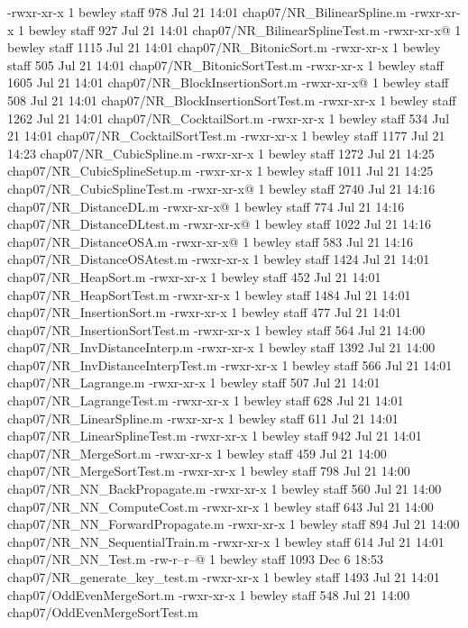 -rwxr-xr-x  1 bewley  staff    978 Jul 21 14:01 chap07/NR_BilinearSpline.m
-rwxr-xr-x  1 bewley  staff    927 Jul 21 14:01 chap07/NR_BilinearSplineTest.m
-rwxr-xr-x@ 1 bewley  staff   1115 Jul 21 14:01 chap07/NR_BitonicSort.m
-rwxr-xr-x  1 bewley  staff    505 Jul 21 14:01 chap07/NR_BitonicSortTest.m
-rwxr-xr-x  1 bewley  staff   1605 Jul 21 14:01 chap07/NR_BlockInsertionSort.m
-rwxr-xr-x@ 1 bewley  staff    508 Jul 21 14:01 chap07/NR_BlockInsertionSortTest.m
-rwxr-xr-x  1 bewley  staff   1262 Jul 21 14:01 chap07/NR_CocktailSort.m
-rwxr-xr-x  1 bewley  staff    534 Jul 21 14:01 chap07/NR_CocktailSortTest.m
-rwxr-xr-x  1 bewley  staff   1177 Jul 21 14:23 chap07/NR_CubicSpline.m
-rwxr-xr-x  1 bewley  staff   1272 Jul 21 14:25 chap07/NR_CubicSplineSetup.m
-rwxr-xr-x  1 bewley  staff   1011 Jul 21 14:25 chap07/NR_CubicSplineTest.m
-rwxr-xr-x@ 1 bewley  staff   2740 Jul 21 14:16 chap07/NR_DistanceDL.m
-rwxr-xr-x@ 1 bewley  staff    774 Jul 21 14:16 chap07/NR_DistanceDLtest.m
-rwxr-xr-x@ 1 bewley  staff   1022 Jul 21 14:16 chap07/NR_DistanceOSA.m
-rwxr-xr-x@ 1 bewley  staff    583 Jul 21 14:16 chap07/NR_DistanceOSAtest.m
-rwxr-xr-x  1 bewley  staff   1424 Jul 21 14:01 chap07/NR_HeapSort.m
-rwxr-xr-x  1 bewley  staff    452 Jul 21 14:01 chap07/NR_HeapSortTest.m
-rwxr-xr-x  1 bewley  staff   1484 Jul 21 14:01 chap07/NR_InsertionSort.m
-rwxr-xr-x  1 bewley  staff    477 Jul 21 14:01 chap07/NR_InsertionSortTest.m
-rwxr-xr-x  1 bewley  staff    564 Jul 21 14:00 chap07/NR_InvDistanceInterp.m
-rwxr-xr-x  1 bewley  staff   1392 Jul 21 14:00 chap07/NR_InvDistanceInterpTest.m
-rwxr-xr-x  1 bewley  staff    566 Jul 21 14:01 chap07/NR_Lagrange.m
-rwxr-xr-x  1 bewley  staff    507 Jul 21 14:01 chap07/NR_LagrangeTest.m
-rwxr-xr-x  1 bewley  staff    628 Jul 21 14:01 chap07/NR_LinearSpline.m
-rwxr-xr-x  1 bewley  staff    611 Jul 21 14:01 chap07/NR_LinearSplineTest.m
-rwxr-xr-x  1 bewley  staff    942 Jul 21 14:01 chap07/NR_MergeSort.m
-rwxr-xr-x  1 bewley  staff    459 Jul 21 14:00 chap07/NR_MergeSortTest.m
-rwxr-xr-x  1 bewley  staff    798 Jul 21 14:00 chap07/NR_NN_BackPropagate.m
-rwxr-xr-x  1 bewley  staff    560 Jul 21 14:00 chap07/NR_NN_ComputeCost.m
-rwxr-xr-x  1 bewley  staff    643 Jul 21 14:00 chap07/NR_NN_ForwardPropagate.m
-rwxr-xr-x  1 bewley  staff    894 Jul 21 14:00 chap07/NR_NN_SequentialTrain.m
-rwxr-xr-x  1 bewley  staff    614 Jul 21 14:01 chap07/NR_NN_Test.m
-rw-r--r--@ 1 bewley  staff   1093 Dec  6 18:53 chap07/NR_generate_key_test.m
-rwxr-xr-x  1 bewley  staff   1493 Jul 21 14:01 chap07/OddEvenMergeSort.m
-rwxr-xr-x  1 bewley  staff    548 Jul 21 14:00 chap07/OddEvenMergeSortTest.m
